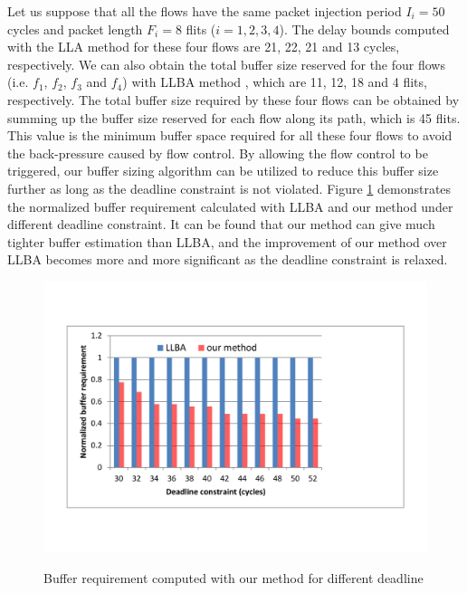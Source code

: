 \documentclass[preprint]{elsarticle}
\begin{document}
Let us suppose that all the flows have the same packet injection period $I_i=50$ cycles and packet length $F_i=8$ flits ($i=1,2,3,4$). The delay bounds computed with the LLA method \cite{73} for these four flows are 21, 22, 21 and 13 cycles, respectively. We can also obtain the total buffer size reserved for the four flows (i.e. $f_1$, $f_2$, $f_3$ and $f_4$) with LLBA method \cite{189}, which are 11, 12, 18 and 4 flits, respectively. The total buffer size required by these four flows can be obtained by summing up the buffer size reserved for each flow along its path, which is 45 flits. This value is the minimum buffer space required for all these four flows to avoid the back-pressure caused by flow control. By allowing the flow control to be triggered, our buffer sizing algorithm can be utilized to reduce this buffer size further as long as the deadline constraint is not violated. Figure \ref{LLBAvsRTC} demonstrates the normalized buffer requirement calculated with LLBA and our method under different deadline constraint. It can be found that our method can give much tighter buffer estimation than LLBA, and the improvement of our method over LLBA becomes more and more significant as the deadline constraint is relaxed.
\begin{figure}
  \centering
  \includegraphics[scale=0.55]{fig8.pdf}\\
  \caption{Buffer requirement computed with our method for different deadline}\label{LLBAvsRTC}
\end{figure}
\end{document}
